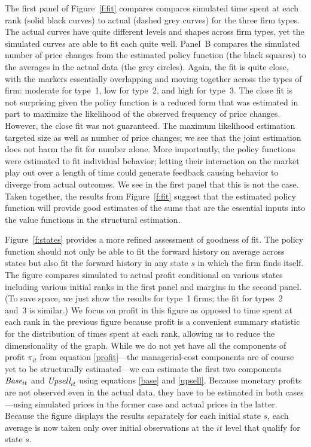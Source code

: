 \documentclass[11pt]{article}
\newcommand{\Base}{\mbox{\it Base}}
\newcommand{\Upsell}{\mbox{\it Upsell}}
\begin{document}
\begin{spacing}{1.3}
The first panel of Figure~\ref{f:fit} compares compares simulated time
spent at each rank (solid black curves) to actual (dashed grey curves)
for the three firm types. The actual curves have quite different
levels and shapes across firm types, yet the simulated curves are able
to fit each quite well. Panel~B compares the simulated number of price
changes from the estimated policy function (the black squares) to the
averages in the actual data (the grey circles). Again, the fit is
quite close, with the markers essentially overlapping and moving
together across the types of firm: moderate for type~1, low for
type~2, and high for type~3. The close fit is not surprising given the
policy function is a reduced form that was estimated in part to
maximize the likelihood of the observed frequency of price
changes. However, the close fit was not guaranteed. The maximum
likelihood estimation targeted size as well as number of price
changes; we see that the joint estimation does not harm the fit for
number alone. More importantly, the policy functions were estimated to
fit individual behavior; letting their interaction on the market play
out over a length of time could generate feedback causing behavior to
diverge from actual outcomes. We see in the first panel that this is
not the case.  Taken together, the results from Figure~\ref{f:fit}
suggest that the estimated policy function will provide good estimates
of the sums that are the essential inputs into the value functions in
the structural estimation.

Figure~\ref{f:states} provides a more refined assessment of goodness
of fit. The policy function should not only be able to fit the forward
history on average across states but also fit the forward history in
any state $s$ in which the firm finds itself. The figure compares
simulated to actual profit conditional on various states including
various initial ranks in the first panel and margins in the second
panel. (To save space, we just show the results for type~1 firms; the
fit for types~2 and~3 is similar.)  We focus on profit in this figure
as opposed to time spent at each rank in the previous figure because
profit is a convenient summary statistic for the distribution of times
spent at each rank, allowing us to reduce the dimensionality of the
graph. While we do not yet have all the components of profit
$\pi_{it}$ from equation \eqref{profit}---the managerial-cost
components are of course yet to be structurally estimated---we can
estimate the first two components $\Base_{it}$ and $\Upsell_{it}$
using equations \eqref{base} and \eqref{upsell}. Because monetary
profits are not observed even in the actual data, they have to be
estimated in both cases---using simulated prices in the former case
and actual prices in the latter. Because the figure displays the
results separately for each initial state $s$, each average is now
taken only over initial observations at the $it$ level that qualify
for state $s$.


\end{spacing}
\end{document}
